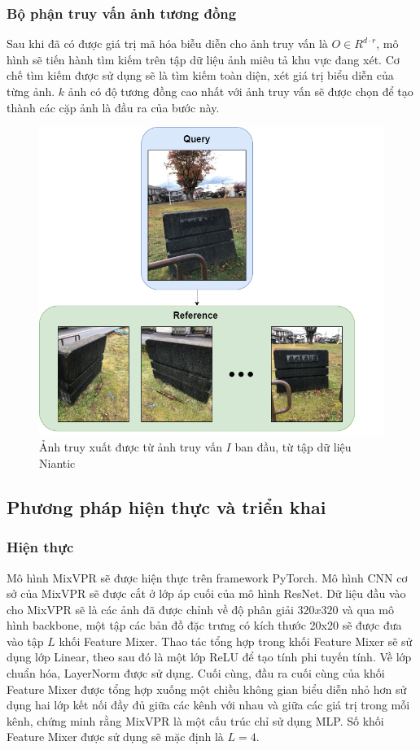 \subsubsection{Bộ phận truy vấn ảnh tương đồng}
Sau khi đã có được giá trị mã hóa biễu diễn cho ảnh truy vấn là $O \in R^{d \cdot r}$, mô hình sẽ tiến hành tìm kiếm trên tập dữ liệu ảnh miêu tả khu vực đang xét. Cơ chế tìm kiếm được sử dụng sẽ là tìm kiếm toàn diện, xét giá trị biểu diễn của từng ảnh. $k$ ảnh có độ tương đồng cao nhất với ảnh truy vấn sẽ được chọn để tạo thành các cặp ảnh là đầu ra của bước này.

\begin{figure}[H]
  \centering
  \includegraphics[scale=0.4]{pics/Proposal/query.png}
  \caption[Kết quả của module VPR]{Ảnh truy xuất được từ ảnh truy vấn $I$ ban đầu, từ tập dữ liệu Niantic \cite{arnold2022mapfree}}
\end{figure}


\subsection{Phương pháp hiện thực và triển khai}
\subsubsection{Hiện thực}
Mô hình MixVPR sẽ được hiện thực trên framework PyTorch. Mô hình CNN cơ sở của MixVPR sẽ được cắt ở lớp áp cuối của mô hình ResNet. Dữ liệu đầu vào cho MixVPR sẽ là các ảnh đã được chỉnh về độ phân giải $320x320$ và qua mô hình backbone, một tập các bản đồ đặc trưng có kích thước 20x20 sẽ được đưa vào tập $L$ khối Feature Mixer. Thao tác tổng hợp trong khối Feature Mixer sẽ sử dụng lớp Linear, theo sau đó là một lớp ReLU để tạo tính phi tuyến tính. Về lớp chuẩn hóa, LayerNorm được sử dụng. Cuối cùng, đầu ra cuối cùng của khối Feature Mixer được tổng hợp xuống một chiều không gian biểu diễn nhỏ hơn sử dụng hai lớp kết nối đầy đủ giữa các kênh với nhau và giữa các giá trị trong mỗi kênh, chứng minh rằng MixVPR là một cấu trúc chỉ sử dụng MLP. Số khối Feature Mixer được sử dụng sẽ mặc định là $L=4$.

